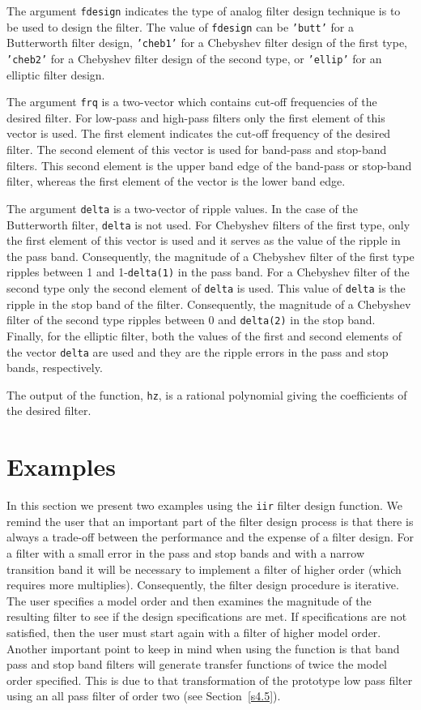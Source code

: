 	The argument {\tt fdesign} indicates the type of analog filter design
technique is to be used to design the filter.  The value of {\tt fdesign}
can be {\tt 'butt'} for a Butterworth filter design, {\tt 'cheb1'}
for a Chebyshev filter design of the first type, {\tt 'cheb2'}
for a Chebyshev filter design of the second type, or {\tt 'ellip'}
for an elliptic filter design.  

	The argument {\tt frq} is a two-vector
which contains cut-off frequencies of the desired filter.  For low-pass
and high-pass filters only the first element of this vector is used.
The first element indicates the cut-off frequency of the desired filter.
The second element of this vector is used
for band-pass and stop-band filters.  This second element is the upper
band edge of the band-pass or stop-band filter, whereas the first
element of the vector is the lower band edge.

	The argument {\tt delta} is a two-vector of ripple values.
In the case of the Butterworth filter, {\tt delta} is not used.
For Chebyshev filters of the first 
type, only the first element of this vector is used and it serves
as the value of the ripple in the pass band.  Consequently,
the magnitude of a Chebyshev filter of the first type
ripples between 1 and 1-{\tt delta(1)} in the pass band.
For a Chebyshev filter of the second type only the second
element of {\tt delta} is used.  This value of {\tt delta}
is the ripple in the stop band of the filter.  Consequently,
the magnitude of a Chebyshev filter of the second type
ripples between 0 and {\tt delta(2)} in the stop band.
Finally, for the elliptic filter, both
the values of the first and second elements of the vector {\tt delta}
are used and they are
the ripple errors in the pass and stop bands, respectively.

	The output of the function, {\tt hz}, is a rational polynomial 
giving the coefficients of the desired filter.
\section{Examples}

	In this section we present two examples using the {\tt iir}
filter design function.  We remind the user that an 
important part of the filter design
process is that there is always a trade-off between the performance
and the expense of a filter design.  For
a filter with a small error in the pass and stop bands and with a
narrow transition band it will be necessary to implement a filter of
higher order (which requires more multiplies).  Consequently,
the filter design procedure is iterative.  The user specifies a
model order and then examines the magnitude of the
resulting filter to see if the design specifications are met.  If
specifications are not satisfied, then the user must start again
with a filter of higher model order.  Another important point to
keep in mind when using the function is that band pass and stop band
filters will generate transfer functions of twice the model order
specified.  This is due to that transformation of the prototype 
low pass filter using an all pass filter of order two 
(see Section~\ref{s4.5}).

